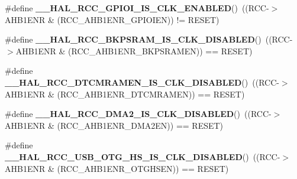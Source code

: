 \begin{DoxyCompactItemize}
\item 
\mbox{\label{group___r_c_c_ex___peripheral___clock___enable___disable___status_ga00e483b835f0fb709a98aefa63bf5b44}} 
\#define {\bfseries \+\_\+\+\_\+\+H\+A\+L\+\_\+\+R\+C\+C\+\_\+\+G\+P\+I\+O\+I\+\_\+\+I\+S\+\_\+\+C\+L\+K\+\_\+\+E\+N\+A\+B\+L\+ED}()~((R\+CC-\/$>$A\+H\+B1\+E\+NR \& (R\+C\+C\+\_\+\+A\+H\+B1\+E\+N\+R\+\_\+\+G\+P\+I\+O\+I\+EN)) != R\+E\+S\+ET)
\item 
\mbox{\label{group___r_c_c_ex___peripheral___clock___enable___disable___status_ga87b77dc5cf8c1ead0609710cdd07e1b4}} 
\#define {\bfseries \+\_\+\+\_\+\+H\+A\+L\+\_\+\+R\+C\+C\+\_\+\+B\+K\+P\+S\+R\+A\+M\+\_\+\+I\+S\+\_\+\+C\+L\+K\+\_\+\+D\+I\+S\+A\+B\+L\+ED}()~((R\+CC-\/$>$A\+H\+B1\+E\+NR \& (R\+C\+C\+\_\+\+A\+H\+B1\+E\+N\+R\+\_\+\+B\+K\+P\+S\+R\+A\+M\+EN)) == R\+E\+S\+ET)
\item 
\mbox{\label{group___r_c_c_ex___peripheral___clock___enable___disable___status_ga176be7a655dcbdc84be1155758ce8e3a}} 
\#define {\bfseries \+\_\+\+\_\+\+H\+A\+L\+\_\+\+R\+C\+C\+\_\+\+D\+T\+C\+M\+R\+A\+M\+E\+N\+\_\+\+I\+S\+\_\+\+C\+L\+K\+\_\+\+D\+I\+S\+A\+B\+L\+ED}()~((R\+CC-\/$>$A\+H\+B1\+E\+NR \& (R\+C\+C\+\_\+\+A\+H\+B1\+E\+N\+R\+\_\+\+D\+T\+C\+M\+R\+A\+M\+EN)) == R\+E\+S\+ET)
\item 
\mbox{\label{group___r_c_c_ex___peripheral___clock___enable___disable___status_ga725d2a38d8519867922438d48a5885cf}} 
\#define {\bfseries \+\_\+\+\_\+\+H\+A\+L\+\_\+\+R\+C\+C\+\_\+\+D\+M\+A2\+\_\+\+I\+S\+\_\+\+C\+L\+K\+\_\+\+D\+I\+S\+A\+B\+L\+ED}()~((R\+CC-\/$>$A\+H\+B1\+E\+NR \& (R\+C\+C\+\_\+\+A\+H\+B1\+E\+N\+R\+\_\+\+D\+M\+A2\+EN)) == R\+E\+S\+ET)
\item 
\mbox{\label{group___r_c_c_ex___peripheral___clock___enable___disable___status_ga5f60d9108d0ac35b86d18119f3370bcd}} 
\#define {\bfseries \+\_\+\+\_\+\+H\+A\+L\+\_\+\+R\+C\+C\+\_\+\+U\+S\+B\+\_\+\+O\+T\+G\+\_\+\+H\+S\+\_\+\+I\+S\+\_\+\+C\+L\+K\+\_\+\+D\+I\+S\+A\+B\+L\+ED}()~((R\+CC-\/$>$A\+H\+B1\+E\+NR \& (R\+C\+C\+\_\+\+A\+H\+B1\+E\+N\+R\+\_\+\+O\+T\+G\+H\+S\+EN)) == R\+E\+S\+ET)

\end{DoxyCompactItemize}
